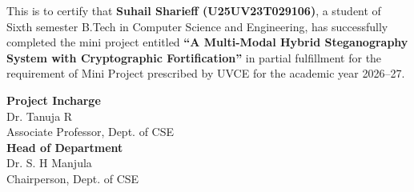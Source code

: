 \documentclass[12pt,a4paper]{report}
\begin{document}
\noindent
This is to certify that \textbf{Suhail Sharieff (U25UV23T029106)}, a student of Sixth semester B.Tech in Computer Science and Engineering, has successfully completed the mini project entitled \textbf{“A Multi-Modal Hybrid Steganography System with Cryptographic Fortification”} in partial fulfillment for the requirement of Mini Project prescribed by UVCE for the academic year 2026–27.\\[2cm]

\begin{flushright}
\textbf{Project Incharge}\\
Dr. Tanuja R\\
Associate Professor, Dept. of CSE\\[1cm]
\textbf{Head of Department}\\
Dr. S. H Manjula\\
Chairperson, Dept. of CSE\\
\end{flushright}
\end{document}

